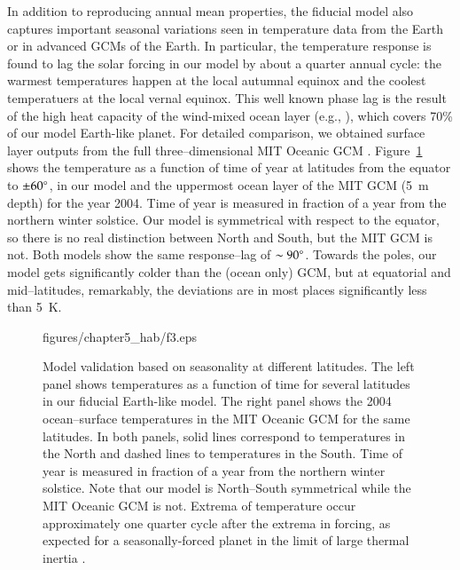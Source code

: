 In addition to reproducing annual mean properties, the fiducial model
also captures important seasonal variations seen in temperature data
from the Earth or in advanced GCMs of the Earth.  In particular, the
temperature response is found to lag the solar forcing in our model by
about a quarter annual cycle: the warmest temperatures happen at the
local autumnal equinox and the coolest temperatuers at the local vernal
equinox.  This well known phase lag is the result of the high heat
capacity of the wind-mixed ocean layer (e.g.,
\citet{north+coakley1979}), which covers 70\% of our model Earth-like
planet.  For detailed comparison, we obtained surface layer outputs
from the full three--dimensional MIT Oceanic GCM
\citep{wunsch+heimbach2007}.  Figure~\ref{hab_fig:us+MIT} shows the
temperature as a function of time of year at latitudes from the
equator to $\pm60\mbox{$^\circ$}$, in our model and the uppermost ocean layer of
the MIT GCM (5~m depth) for the year 2004.  Time of year is measured
in fraction of a year from the northern winter solstice.  Our model is
symmetrical with respect to the equator, so there is no real
distinction between North and South, but the MIT GCM is not.  Both
models show the same response--lag of $\sim 90\mbox{$^\circ$}$.  Towards the
poles, our model gets significantly colder than the (ocean only) GCM,
but at equatorial and mid--latitudes, remarkably, the deviations are
in most places significantly less than 5~K.
\begin{figure}[p]
\plotone
{figures/chapter5_hab/f3.eps}
\caption[Model validation based on seasonality at different
latitudes.]{Model validation based on seasonality at different
latitudes.  The left panel shows temperatures as a function of time
for several latitudes in our fiducial Earth-like model.  The right
panel shows the 2004 ocean--surface temperatures in the MIT Oceanic
GCM \citep{wunsch+heimbach2007} for the same latitudes.  In both
panels, solid lines correspond to temperatures in the North and dashed
lines to temperatures in the South.  Time of year is measured in
fraction of a year from the northern winter solstice.  Note that our
model is North--South symmetrical while the MIT Oceanic GCM is not.
Extrema of temperature occur approximately one quarter cycle after the
extrema in forcing, as expected for a seasonally-forced planet in the
limit of large thermal inertia \citep[e.g.,][]{north+coakley1979}.}
\label{hab_fig:us+MIT}
\end{figure}
\afterpage{\clearpage}

